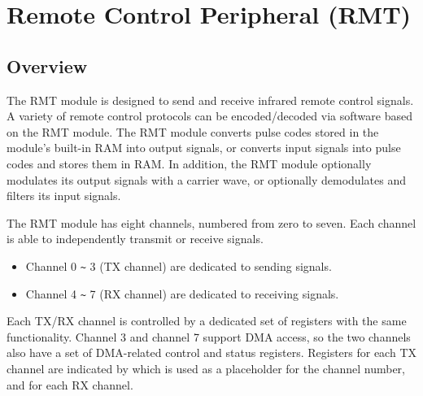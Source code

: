\documentclass[main\_\_EN.tex]{subfiles}
\begin{document}

\ifglobal
\else
    {\let\clearpage\relax \listoftodos}
    \tableofcontents
\fi


\hypertarget{rmt}{}
\chapter{Remote Control Peripheral (RMT)}
\label{mod:rmt}


\section{Overview}
The RMT module is designed to send and receive infrared remote control signals. A variety of remote control protocols can be encoded/decoded via software based on the RMT module. The RMT module converts pulse codes stored in the module's built-in RAM into output signals, or converts input signals into pulse codes and stores them in RAM. In addition, the RMT module optionally modulates its output signals with a carrier wave, or optionally demodulates and filters its input signals.

The RMT module has eight channels, numbered from zero to seven. Each channel is able to independently transmit or receive signals.
\begin{itemize}
    \item Channel 0 \verb+~+ 3 (TX channel) are dedicated to sending signals.
    \item Channel 4 \verb+~+ 7 (RX channel) are dedicated to receiving signals.
\end{itemize}

Each TX/RX channel is controlled by a dedicated set of registers with the same functionality. Channel 3 and channel 7 support DMA access, so the two channels also have a set of DMA-related control and status registers. Registers for each TX channel are indicated by  which is used as a placeholder for the channel number, and  for each RX channel.
\end{document}
